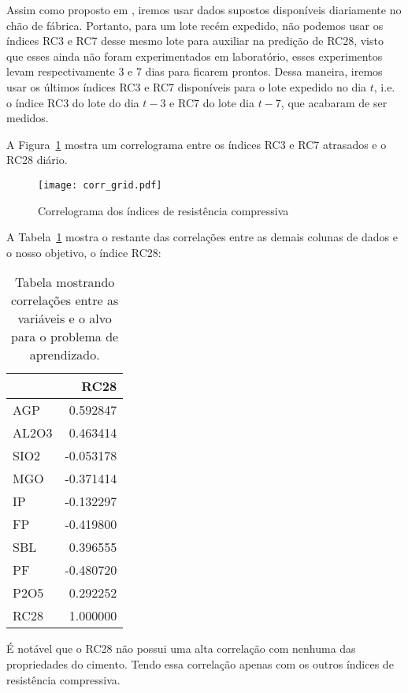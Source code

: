 Assim como proposto em \cite{grecialin}, iremos usar dados supostos disponíveis diariamente no chão de fábrica. Portanto, para um lote recém expedido,
não podemos usar os índices RC3 e RC7 desse mesmo lote para auxiliar na predição
de RC28, visto que esses ainda não foram experimentados em laboratório, esses
experimentos levam respectivamente 3 e 7 dias para ficarem prontos. Dessa maneira, iremos usar os últimos índices RC3 e RC7 disponíveis para o lote expedido no dia $t$,
i.e. o índice RC3 do lote do dia $t-3$ e RC7 do lote dia $t-7$, que acabaram de ser medidos. 

A Figura~\ref{fig:gridcorr} mostra um correlograma entre os índices RC3 e RC7
atrasados e o RC28 diário. 

\begin{figure}[H]
  \centering
  \texttt{[image: corr\_grid.pdf]}
  \caption{Correlograma dos índices de resistência compressiva}
  \label{fig:gridcorr}
\end{figure}

A Tabela~\ref{tabelacorr} mostra o restante das correlações entre as demais
colunas de dados e o nosso objetivo, o índice RC28:


\begin{table}[H]
  \centering
\begin{tabular}{lr}
  \toprule
  {} &      RC28 \\
  \midrule
  AGP   &  0.592847 \\
  AL2O3 &  0.463414 \\
  SIO2  & -0.053178 \\
  MGO   & -0.371414 \\
  IP    & -0.132297 \\
  FP    & -0.419800 \\
  SBL   &  0.396555 \\
  PF    & -0.480720 \\
  P2O5  &  0.292252 \\
  RC28  &  1.000000 \\
  \bottomrule
\end{tabular}
\caption{Tabela mostrando correlações entre as variáveis e o alvo para o problema de aprendizado.}
\label{tabelacorr}
\end{table}


É notável que o RC28 não possui uma alta correlação com nenhuma das propriedades
do cimento. Tendo essa correlação apenas com os outros índices de resistência compressiva.




